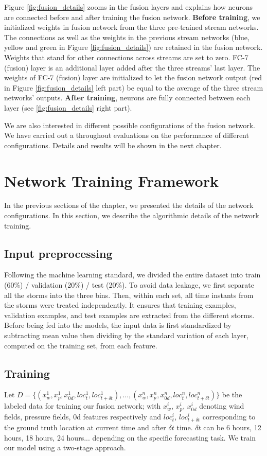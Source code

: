 Figure \ref{fig:fusion_details} zooms in the fusion layers and explains how neurons are connected before and after training the fusion network. \textbf{Before training}, we initialized weights in fusion network from the three pre-trained stream networks. The connections as well as the weights in the previous stream networks (blue, yellow and green in Figure \ref{fig:fusion_details}) are retained in the fusion network. Weights that stand for other connections across streams are set to zero. FC-7 (fusion) layer is an additional layer added after the three streams' last layer. The weights of FC-7 (fusion) layer are initialized to let the fusion network output (red in Figure \ref{fig:fusion_details} left part) be equal to the average of the three stream networks' outputs. \textbf{After training}, neurons are fully connected between each layer (see \ref{fig:fusion_details} right part).

We are also interested in different possible configurations of the fusion network. We have carried out a throughout evaluations on the performance of different configurations. Details and results will be shown in the next chapter. 




\section{Network Training Framework}
In the previous sections of the chapter, we presented the details of the network configurations. In this section, we describe the algorithmic details of the network training.

\subsection{Input preprocessing}
Following the machine learning standard, we divided the entire dataset into train (60\%) / validation (20\%) / test (20\%). To avoid data leakage, we first separate all the storms into the three bins. Then, within each set, all time instants from the storms were treated independently. It ensures that training examples, validation examples, and test examples are extracted from the different storms. Before being fed into the models, the input data is first standardized by subtracting mean value then dividing by the standard variation of each layer, computed on the training set, from each feature. 

\subsection{Training}  
Let $D = \{(x_w^1, x_p^1, x_{0d}^1, loc_t^1, loc_{t+\delta t}^1), ..., (x_w^n, x_p^n, x_{0d}^n, loc_t^n, loc_{t+\delta t}^n)\}$ be the labeled data for training our fusion network; with $x_w^i$, $x_p^i$, $x_{0d}^i$ denoting wind fields, pressure fields, 0d features respectively and $loc_t^i$, $loc_{t+\delta t}^i$ corresponding to the ground truth location at current time and after $\delta t$ time. $\delta t$ can be 6 hours, 12 hours, 18 hours, 24 hours... depending on the specific forecasting task. We train our model using a two-stage approach.


